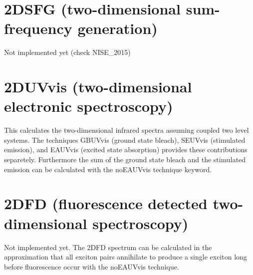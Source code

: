 \section{2DSFG (two-dimensional sum-frequency generation)}
 Not implemented yet (check NISE\_2015)
\section{2DUVvis (two-dimensional electronic spectroscopy)}
This calculates the two-dimensional infrared spectra assuming coupled two level systems. The techniques GBUVvis (ground state bleach), SEUVvis (stimulated emission), and EAUVvis (excited state absorption) provides these contributions separetely. Furthermore the sum of the ground state bleach and the stimulated emission can be calculated with the noEAUVvis technique keyword.
\section{2DFD (fluorescence detected two-dimensional spectroscopy)}
 Not implemented yet. The 2DFD spectrum can be calculated in the approximation that all exciton pairs annihilate to produce a single exciton long before fluorescence occur with the noEAUVvis technique.
